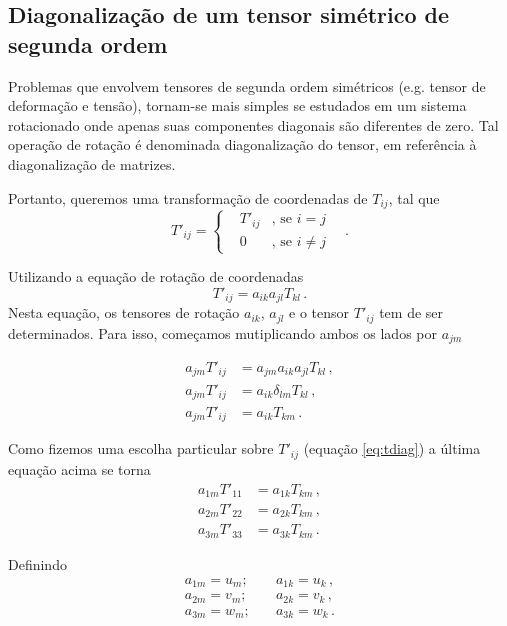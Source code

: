 \subsection{Diagonaliza\c{c}\~ao de um tensor sim\'etrico de segunda ordem}

Problemas que envolvem tensores de segunda ordem sim\'etricos (e.g. tensor de
deforma\c{c}\~ao e tens\~ao), tornam-se mais simples se estudados em um sistema
rotacionado onde apenas suas componentes diagonais s\~ao diferentes de zero.
Tal opera\c{c}\~ao de rota\c{c}\~ao \'e denominada diagonaliza\c{c}\~ao do
tensor, em refer\^encia \`a diagonaliza\c{c}\~ao de matrizes.

Portanto, queremos uma transforma\c{c}\~ao de coordenadas de $T_{ij}$, tal que
\begin{equation}
  T'_{ij}=\left\{\begin{aligned}
    &T'_{ij}&,\, \text{se } i=j& \\
     &0&,\, \text{se } i\neq j&
\end{aligned}\right.
\, .
  \label{eq:tdiag}
\end{equation}

Utilizando a equa\c{c}\~ao de rota\c{c}\~ao de coordenadas
\begin{equation}
  T'_{ij} = a_{ik}a_{jl}T_{kl} \, .
\end{equation}
Nesta equa\c{c}\~ao, os tensores de rota\c{c}\~ao $a_{ik}$, $a_{jl}$ e o tensor
$T'_{ij}$ tem de ser determinados. Para isso, come\c{c}amos mutiplicando ambos os lados por $a_{jm}$

\begin{align}
  a_{jm}T'_{ij} &= a_{jm}a_{ik}a_{jl}T_{kl} \, ,\\
  a_{jm}T'_{ij} &= a_{ik}\delta_{lm}T_{kl} \, ,\\
  a_{jm}T'_{ij} &=a_{ik}T_{km} \,. \label{eq:eigvect1}
\end{align}

Como fizemos uma escolha particular sobre $T'_{ij}$ (equa\c{c}\~ao
\ref{eq:tdiag}) a \'ultima equa\c{c}\~ao acima se torna
\begin{align}
  a_{1m}T'_{11}  &=  a_{1k}T_{km}\, , \label{eq:eigvect2start}\\
  a_{2m}T'_{22}  &=  a_{2k}T_{km} \, ,\\
  a_{3m}T'_{33}  &=  a_{3k}T_{km} \,.\label{eq:eigvect2end}
\end{align}

Definindo
\begin{align}
  a_{1m} = u_{m}; \quad  &a_{1k} = u_{k} \, , \\
  a_{2m} = v_{m}; \quad  &a_{2k} = v_{k} \, , \\
  a_{3m} = w_{m}; \quad  &a_{3k} = w_{k} \, .
\end{align}

